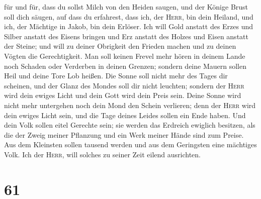 für und für,  dass du sollst Milch von den Heiden saugen,
und der Könige Brust soll dich säugen, auf dass du erfahrest, dass ich,
der \textsc{Herr}, bin dein Heiland, und ich, der Mächtige in Jakob, bin
dein Erlöser.  Ich will Gold anstatt des Erzes und Silber
anstatt des Eisens bringen und Erz anstatt des Holzes und Eisen anstatt
der Steine; und will zu deiner Obrigkeit den Frieden machen und zu
deinen Vögten die Gerechtigkeit.  Man soll keinen Frevel
mehr hören in deinem Lande noch Schaden oder Verderben in deinen
Grenzen; sondern deine Mauern sollen Heil und deine Tore Lob heißen.
 Die Sonne soll nicht mehr des Tages dir scheinen, und
der Glanz des Mondes soll dir nicht leuchten; sondern der \textsc{Herr}
wird dein ewiges Licht und dein Gott wird dein Preis sein.
 Deine Sonne wird nicht mehr untergehen noch dein Mond
den Schein verlieren; denn der \textsc{Herr} wird dein ewiges Licht
sein, und die Tage deines Leides sollen ein Ende haben. 
Und dein Volk sollen eitel Gerechte sein; sie werden das Erdreich
ewiglich besitzen, als die der Zweig meiner Pflanzung und ein Werk
meiner Hände sind zum Preise.  Aus dem Kleinsten sollen
tausend werden und aus dem Geringsten eine mächtiges Volk. Ich der
\textsc{Herr}, will solches zu seiner Zeit eilend ausrichten.

\hypertarget{section-60}{%
\section{61}\label{section-60}}

